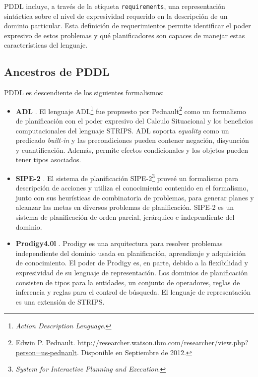 PDDL incluye, a trav\'es de la etiqueta \texttt{requirements}, 
una representaci\'on sint\'actica sobre el nivel de expresividad 
requerido en la descripci\'on de un dominio particular. 
Esta definici\'on de requerimientos permite identificar el poder 
expresivo de estos problemas y qu\'e planificadores son capaces 
de manejar estas caracter\'isticas del lenguaje.


\subsection{Ancestros de PDDL} %

PDDL es descendiente de los siguientes formalismos:

\begin{itemize}

\item {\bf ADL} \cite{gbraun:Pednault:1989:adl}. 
El lenguaje ADL\footnote{\emph{Action Description 
Lenguage}.} fue propuesto por Pednault\footnote{Edwin P. 
Pednault. \url{http://researcher.watson.ibm.com/researcher/view.php?person=us-pednault}. Disponible
en Septiembre de 2012.}
como un formalismo de planificaci\'on con el poder expresivo del Calculo 
Situacional \cite{gbraun:McCHay69} y los beneficios 
computacionales del lenguaje STRIPS. %
ADL soporta \emph{equality} como un predicado
\emph{built-in} y las precondiciones pueden contener
negaci\'on, disyunci\'on y cuantificaci\'on. Adem\'as, permite
efectos condicionales y los objetos pueden tener
tipos asociados.

\item {\bf SIPE-2} \cite{gbraun:AICPub443:1997}. El sistema de planificaci\'on 
SIPE-2\footnote{\emph{System for Interactive Planning and Execution}.} prove\'e 
un formalismo para descripci\'on de acciones y utiliza el conocimiento 
contenido en el formalismo, junto con sus heur\'isticas de combinatoria de problemas, 
para generar planes y alcanzar las metas en diversos pro\-ble\-mas de planificaci\'on. 
SIPE-2 es un sistema de planificaci\'on de orden parcial, 
jer\'arquico e independiente del dominio. 

\item {\bf Prodigy4.0l} \cite{gbraun:prodigy}. Prodigy es una arquitectura para resolver problemas
independiente del dominio usada en planificaci\'on, aprendizaje y adquisici\'on de 
conocimiento. El poder de Prodigy es, en parte, debido a la flexibilidad y
expresividad de su lenguaje de representaci\'on. Los dominios de planificaci\'on
consisten de tipos para la entidades, un conjunto de operadores, reglas de 
inferencia y reglas para el control de b\'usqueda. El lenguaje de representaci\'on
es una extensi\'on de STRIPS.


\end{itemize}
